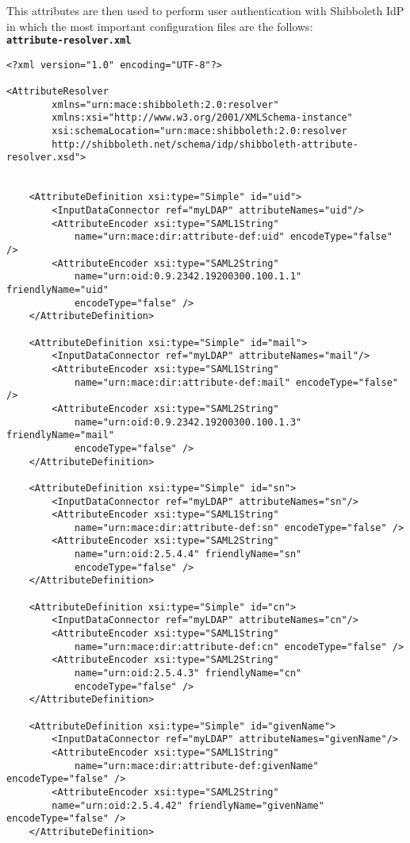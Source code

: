 This attributes are then used to perform user authentication with Shibboleth IdP in which the most important configuration files are the follows:\\
\textbf{\texttt{attribute-resolver.xml}}
\begin{verbatim}
<?xml version="1.0" encoding="UTF-8"?>

<AttributeResolver
        xmlns="urn:mace:shibboleth:2.0:resolver" 
        xmlns:xsi="http://www.w3.org/2001/XMLSchema-instance" 
        xsi:schemaLocation="urn:mace:shibboleth:2.0:resolver
        http://shibboleth.net/schema/idp/shibboleth-attribute-resolver.xsd">


    <AttributeDefinition xsi:type="Simple" id="uid">
        <InputDataConnector ref="myLDAP" attributeNames="uid"/>
        <AttributeEncoder xsi:type="SAML1String" 
            name="urn:mace:dir:attribute-def:uid" encodeType="false" />
        <AttributeEncoder xsi:type="SAML2String" 
            name="urn:oid:0.9.2342.19200300.100.1.1" friendlyName="uid" 
            encodeType="false" />
    </AttributeDefinition>

    <AttributeDefinition xsi:type="Simple" id="mail">
        <InputDataConnector ref="myLDAP" attributeNames="mail"/>
        <AttributeEncoder xsi:type="SAML1String" 
            name="urn:mace:dir:attribute-def:mail" encodeType="false" />
        <AttributeEncoder xsi:type="SAML2String"
            name="urn:oid:0.9.2342.19200300.100.1.3" friendlyName="mail" 
            encodeType="false" />
    </AttributeDefinition>

    <AttributeDefinition xsi:type="Simple" id="sn">
        <InputDataConnector ref="myLDAP" attributeNames="sn"/>
        <AttributeEncoder xsi:type="SAML1String" 
            name="urn:mace:dir:attribute-def:sn" encodeType="false" />
        <AttributeEncoder xsi:type="SAML2String" 
            name="urn:oid:2.5.4.4" friendlyName="sn" 
            encodeType="false" />
    </AttributeDefinition>

    <AttributeDefinition xsi:type="Simple" id="cn">
        <InputDataConnector ref="myLDAP" attributeNames="cn"/>
        <AttributeEncoder xsi:type="SAML1String" 
            name="urn:mace:dir:attribute-def:cn" encodeType="false" />
        <AttributeEncoder xsi:type="SAML2String" 
            name="urn:oid:2.5.4.3" friendlyName="cn"
            encodeType="false" />
    </AttributeDefinition>

    <AttributeDefinition xsi:type="Simple" id="givenName">
        <InputDataConnector ref="myLDAP" attributeNames="givenName"/>
        <AttributeEncoder xsi:type="SAML1String" 
            name="urn:mace:dir:attribute-def:givenName" encodeType="false" />
        <AttributeEncoder xsi:type="SAML2String" 
        name="urn:oid:2.5.4.42" friendlyName="givenName" encodeType="false" />
    </AttributeDefinition>


\end{verbatim}
